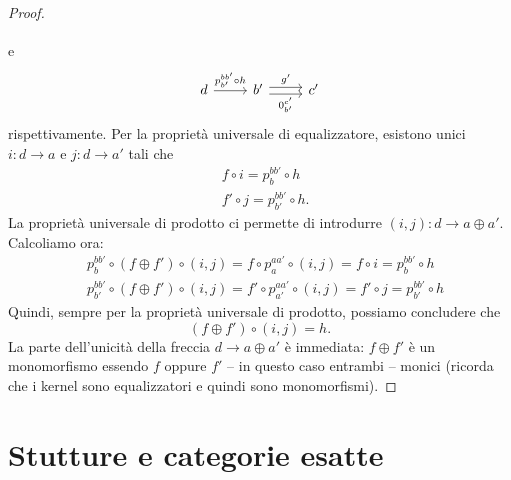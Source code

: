 \begin{proof}
\[\begin{tikzcd}
    \end{tikzcd}
  \]
  e
  \[
    \begin{tikzcd}
      d \ar["{p_{b'}^{bb'} \circ h}", r] & b' \ar["{g'}", r, shift left]
      \ar["{0_{b'}^{c'}}", r, shift right, swap] & c'
    \end{tikzcd}
  \]
  rispettivamente. Per la proprietà universale di equalizzatore,
  esistono unici \(i : d \to a\) e \(j : d \to a'\) tali che
  \begin{align*}
    & f \circ i = p_b^{bb'} \circ h \\
    & f' \circ j = p_{b'}^{bb'} \circ h .
  \end{align*}
  La proprietà universale di prodotto ci permette di introdurre
  \((i,j) : d \to a \oplus a'\).  Calcoliamo ora:
  \begin{align*}
    & p_b^{bb'} \circ (f \oplus f') \circ (i,j) = f \circ p_a^{aa'} \circ (i,j) = f \circ i = p_b^{bb'} \circ h \\
    & p_{b'}^{bb'} \circ (f \oplus f') \circ (i,j) = f' \circ p_{a'}^{aa'} \circ (i,j) = f' \circ j = p_{b'}^{bb'} \circ h
  \end{align*}
  Quindi, sempre per la proprietà universale di prodotto, possiamo
  concludere che
  \[
    (f \oplus f') \circ (i,j) = h.
  \]
  La parte dell'unicità della freccia \(d \to a \oplus a'\) è immediata: \(f
  \oplus f'\) è un monomorfismo essendo \(f\) oppure \(f'\) -- in questo
  caso entrambi -- monici (ricorda che i kernel sono equalizzatori e
  quindi sono monomorfismi).
\end{proof}



\section{Stutture e categorie esatte}

